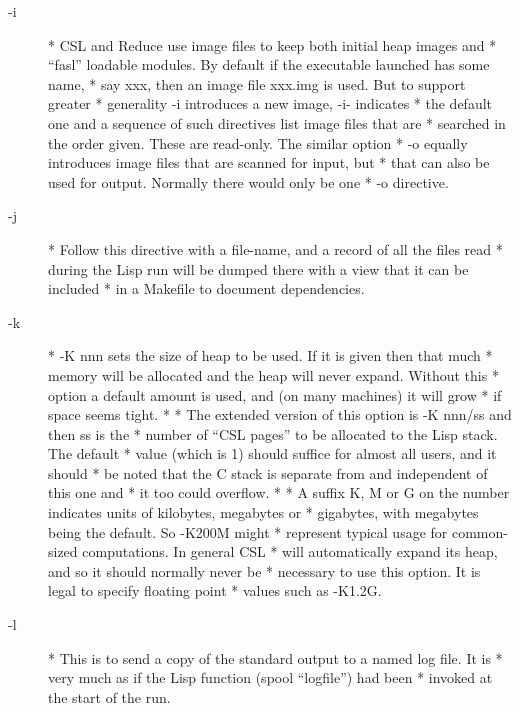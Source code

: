 \documentclass[a4paper,11pt]{article}
\begin{document}
\begin{description}
\item [{\ttfamily -i}] 
          * CSL and Reduce use image files to keep both initial heap images and
          * ``fasl'' loadable modules. By default if the executable launched has some name,
          * say xxx, then an image file xxx.img is used. But to support greater
          * generality {\ttfamily -i} introduces a new image, {\ttfamily -i-} indicates
          * the default one and a sequence of such directives list image files that are
          * searched in the order given. These are read-only. The similar option
          * {\ttfamily -o} equally introduces image files that are scanned for input, but
          * that can also be used for output. Normally there would only be one
          * {\ttfamily -o} directive.

\item [{\ttfamily -j}] 
          * Follow this directive with a file-name, and a record of all the files read
          * during the Lisp run will be dumped there with a view that it can be included
          * in a Makefile to document dependencies.

\item [{\ttfamily -k}] 
          * {\ttfamily -K nnn} sets the size of heap to be used.  If it is given then that much
          * memory will be allocated and the heap will never expand.  Without this
          * option a default amount is used, and (on many machines) it will grow
          * if space seems tight.
          *
          * The extended version of this option is {\ttfamily -K nnn/ss} and then ss is the
          * number of ``CSL pages'' to be allocated to the Lisp stack. The default
          * value (which is 1) should suffice for almost all users, and it should
          * be noted that the C stack is separate from and independent of this one and
          * it too could overflow.
          *
          * A suffix K, M or G on the number indicates units of kilobytes, megabytes or
          * gigabytes, with megabytes being the default. So {\ttfamily -K200M} might
          * represent typical usage for common-sized computations. In general CSL
          * will automatically expand its heap, and so it should normally never be
          * necessary to use this option. It is legal to specify floating point
          * values such as -K1.2G.

\item [{\ttfamily -l}] 
          * This is to send a copy of the standard output to a named log file. It is
          * very much as if the Lisp function {\ttfamily (spool ``logfile'')} had been
          * invoked at the start of the run.


\end{description}
\end{document}
